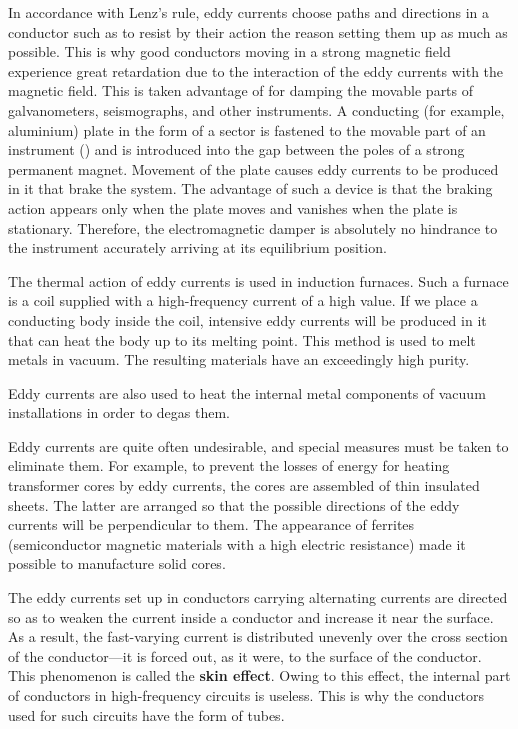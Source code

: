 In accordance with Lenz's rule, eddy currents choose paths and directions in a conductor such as to resist by their action the reason setting them up as much as possible.
This is why good conductors moving in a strong magnetic field experience great retardation due to the interaction of the eddy currents with the magnetic field.
This is taken advantage of for damping the movable parts of galvanometers, seismographs, and other instruments.
A conducting (for example, aluminium) plate in the form of a sector is fastened to the movable part of an instrument () and is introduced into the gap between the poles of a strong permanent magnet.
Movement of the plate causes eddy currents to be produced in it that brake the system.
The advantage of such a device is that the braking action appears only when the plate moves and vanishes when the plate is stationary.
Therefore, the electromagnetic damper is absolutely no hindrance to the instrument accurately arriving at its equilibrium position.

The thermal action of eddy currents is used in induction furnaces.
Such a furnace is a coil supplied with a high-frequency current of a high value.
If we place a conducting body inside the coil, intensive eddy currents will be produced in it that
can heat the body up to its melting point.
This method is used to melt metals in vacuum.
The resulting materials have an exceedingly high purity.

Eddy currents are also used to heat the internal metal components of vacuum installations in order to degas them.

Eddy currents are quite often undesirable, and special measures must be taken to eliminate them.
For example, to prevent the losses of energy for heating transformer cores by eddy currents, the cores are assembled of thin insulated sheets.
The latter are arranged so that the possible directions of the eddy currents will be perpendicular to them.
The appearance of ferrites (semiconductor magnetic materials with a high electric resistance) made it possible to manufacture solid cores.

The eddy currents set up in conductors carrying alternating currents are directed so as to weaken the current inside a conductor and increase it near the surface.
As a result, the fast-varying current is distributed
unevenly over the cross section of the conductor---it is forced out, as it were, to the surface of the conductor.
This phenomenon is called the \textbf{skin effect}.
Owing to this effect, the internal part of conductors in high-frequency circuits is useless. This is why the conductors used for such circuits have the form of tubes.

